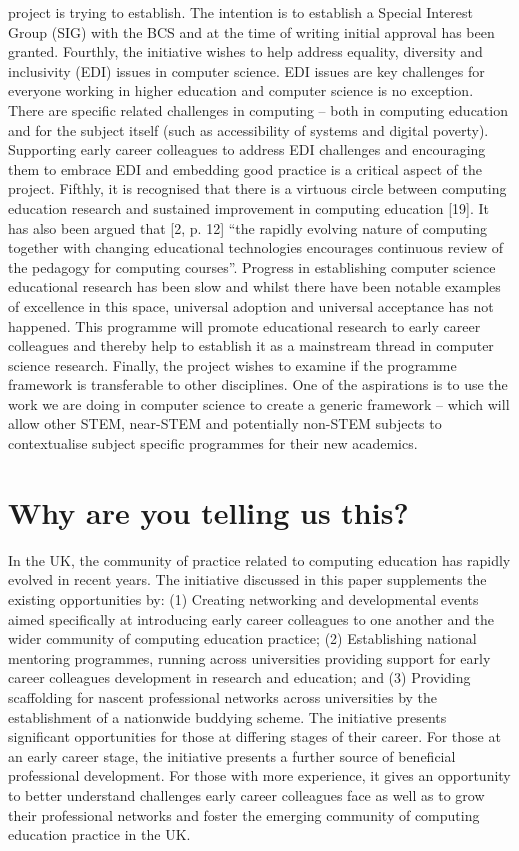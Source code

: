 \documentclass[sigconf]{acmart}
\begin{document}
project is trying to establish. The intention is to establish a
Special Interest Group (SIG) with the BCS \cite{BCSSIG} and at the
time of writing initial approval has been granted. Fourthly, the
initiative wishes to help address equality, diversity and inclusivity
(EDI) issues in computer science. EDI issues are key challenges for
everyone working in higher education and computer science is no
exception. There are specific related challenges in computing – both
in computing education and for the subject itself (such as
accessibility of systems and digital poverty). Supporting early career
colleagues to address EDI challenges and encouraging them to embrace
EDI and embedding good practice is a critical aspect of the
project. Fifthly, it is recognised that there is a virtuous circle
between computing education research and sustained improvement in
computing education [19]. It has also been argued that [2, p. 12] “the
rapidly evolving nature of computing together with changing
educational technologies encourages continuous review of the pedagogy
for computing courses”. Progress in establishing computer science
educational research has been slow and whilst there have been notable
examples of excellence in this space, universal adoption and universal
acceptance has not happened. This programme will promote educational
research to early career colleagues and thereby help to establish it
as a mainstream thread in computer science research. Finally, the
project wishes to examine if the programme framework is transferable
to other disciplines. One of the aspirations is to use the work we are
doing in computer science to create a generic framework – which will
allow other STEM, near-STEM and potentially non-STEM subjects to
contextualise subject specific programmes for their new academics.


\section{Why are you telling us this?}
 In the UK, the community of practice related to computing education
has rapidly evolved in recent years. The initiative discussed in this
paper supplements the existing opportunities by: (1) Creating
networking and developmental events aimed specifically at introducing
early career colleagues to one another and the wider community of
computing education practice; (2) Establishing national mentoring
programmes, running across universities providing support for early
career colleagues development in research and education; and (3)
Providing scaffolding for nascent professional networks across
universities by the establishment of a nationwide buddying scheme. The
initiative presents significant opportunities for those at differing
stages of their career.  For those at an early career stage, the
initiative presents a further source of beneficial professional
development. For those with more experience, it gives an opportunity
to better understand challenges early career colleagues face as well
as to grow their professional networks and foster the emerging
community of computing education practice in the UK.
\end{document}
